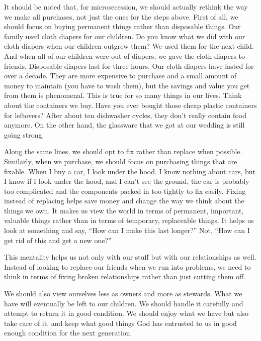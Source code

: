 \begin{infonote}

It should be noted that, for microsecession, we should actually rethink
the way we make all purchases, not just the ones for the steps above.
First of all, we should focus on buying permanent things rather than
disposable things. Our family used cloth diapers for our children. Do
you know what we did with our cloth diapers when our children outgrew
them?  We used them for the next child. And when all of our children
were out of diapers, we gave the cloth diapers to friends.  Disposable diapers
last for three hours. Our cloth diapers have lasted for over a decade.
They are more expensive to purchase and a small amount of money to
maintain (you have to wash them), but the savings and value you get
from them is phenomenal. This is true for so many things in our lives.
Think about the containers we buy. Have you ever bought those cheap
plastic containers for leftovers?  After about ten dishwasher cycles,
they don't really contain food anymore. On the other
hand, the glassware that we got at our wedding is still going strong. 

Along the same lines, we should opt to fix rather than replace when
possible. Similarly, when we purchase, we should focus on purchasing
things that are fixable. When I buy a car, I look under the hood. I
know nothing about cars, but I know if I look under the hood, and I
can't see the ground, the car is probably too
complicated and the components packed in too tightly to fix easily. Fixing instead of replacing
helps save money and
change the way we think about the things we own. It makes us view the
world in terms of permanent, important, valuable things rather than in
terms of temporary, replaceable things. It helps us look at
something and say, ``How can I make this last longer?'' Not, ``How can I get rid of this and
get a new one?''

This mentality helps us not only with our stuff but with our
relationships as well. Instead of looking to replace our friends when
we run into problems, we need to think in
terms of fixing broken relationships rather than just cutting them off.

We should also view ourselves less as owners and more as stewards. What we
have will eventually be left to our children. We should handle it
carefully and attempt to return it in good condition. We should enjoy
what we have but also take care of it, and keep what good things God
has entrusted to us in good enough condition for the next generation.


\end{infonote}
